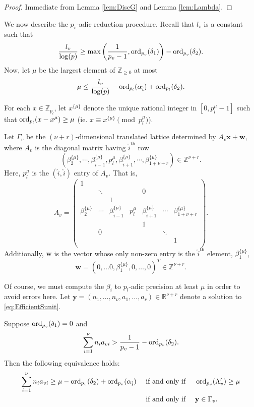 \begin{proof}
Immediate from Lemma \ref{lem:DiscG} and Lemma \ref{lem:Lambda}. 
\end{proof}

We now describe the $p_v$-adic reduction procedure. Recall that $l_v$ is a constant such that
\[\frac{l_v}{\log(p)} \geq \max\left( \frac{1}{p_v-1}, \operatorname{ord}_{p_v}(\delta_1)\right) - \operatorname{ord}_{p_v}(\delta_2).\]
Now, let $\mu$ be the largest element of $\mathbb{Z}_{\geq 0}$ at most
\[\mu \leq \frac{l_v}{\log(p)} - \operatorname{ord}_{p_l}(\alpha_{\hat{i}}) + \operatorname{ord}_{p_l}(\delta_2).\]

For each $x \in \mathbb{Z}_{p_l}$, let $x^{\{\mu\}}$ denote the unique rational integer in $[0,p_l^{\mu} - 1]$ such that $\operatorname{ord}_{p_l}(x - x^{\mu}) \geq \mu$ (ie. $x \equiv x^{\{\mu\}} \pmod{p_l^{\mu}}$). 

Let $\Gamma_{v}$ be the $(\nu+r)$-dimensional translated lattice determined by $A_{v}\mathbf{x} + \mathbf{w}$, where $A_{v}$ is the diagonal matrix having $\hat{i}^{\text{th}}$ row 
\[\left(\beta_2^{\{\mu\}}, \cdots, \beta_{\hat{i} - 1}^{\{\mu\}}, p_l^{\mu}, \beta_{\hat{i} + 1}^{\{\mu\}}, \cdots, \beta_{1+ \nu+ r}^{\{\mu\}}\right) \in \mathbb{Z}^{\nu+r}.\]
Here, $p_l^{\mu}$ is the $(\hat{i},\hat{i})$ entry of $A_{v}$. That is, 
\[A_{v} = 
\begin{pmatrix}
1	& 		&		&		&		&		&	\\
	& \ddots	& 		&		& 0		& 		&	\\
	&		& 1		&		&		&		&	\\
	\beta_2^{\{\mu\}}& \cdots & \beta_{\hat{i} - 1}^{\{\mu\}} & p_l^{\mu} & \beta_{\hat{i} + 1}^{\{\mu\}}& \cdots &\beta_{1+ \nu+ r}^{\{\mu\}}\\
	& 		& 		& 		& 1		&		&	\\	
	& 0		& 		& 		&		& \ddots	&	\\	
	& 		& 		& 		&		& 		& 1	\\	
\end{pmatrix}.\]
Additionally, $\mathbf{w}$ is the vector whose only non-zero entry is the $\hat{i}^{\text{th}}$ element, $ \beta_1^{\{\mu\}}$,
\[\mathbf{w} = (0, \dots 0, \beta_1^{\{\mu\}},0, \dots, 0)^T \in \mathbb{Z}^{\nu + r}.\]

Of course, we must compute the $\beta_i$ to $p_l$-adic precision at least $\mu$ in order to avoid errors here. 
Let $\mathbf{y} = (n_1, \dots, n_{\nu}, a_1, \dots, a_r) \in \mathbb{R}^{\nu + r}$ denote a solution to \eqref{eq:EfficientSunit}. 

\begin{lemma}
Suppose $\operatorname{ord}_{p_v}(\delta_1) = 0$ and 
\[\sum_{i = 1}^{\nu} n_{i}a_{vi} > \frac{1}{p_v-1} - \operatorname{ord}_{p_v}(\delta_2).\]
Then the following equivalence holds: 
\begin{align*}
\sum_{i = 1}^{\nu} n_{i}a_{vi}  \geq \mu - \operatorname{ord}_{p_v}(\delta_2) + \operatorname{ord}_{p_v}(\alpha_{\hat{i}}) 
	& \quad \text{ if and only if } \quad \operatorname{ord}_{p_v}(\Lambda_v') \geq \mu \\
	& \quad \text{ if and only if } \quad \mathbf{y} \in\Gamma_v.
\end{align*}
\end{lemma} 

